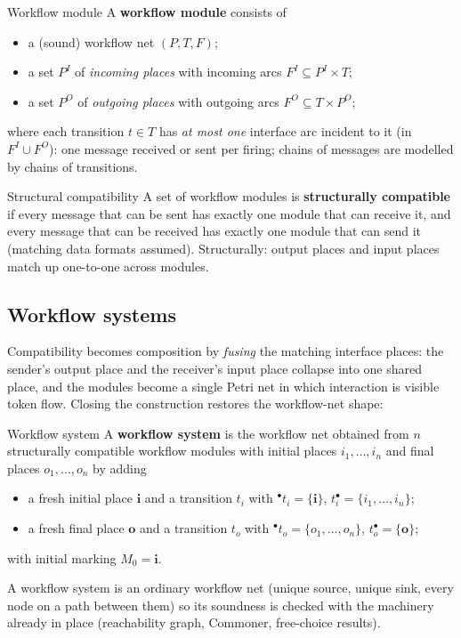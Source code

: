 \begin{definitionbox}{Workflow module}
A \textbf{workflow module} consists of
\begin{itemize}
  \item a (sound) workflow net $(P, T, F)$;
  \item a set $P^I$ of \emph{incoming places} with incoming arcs $F^I \subseteq P^I \times T$;
  \item a set $P^O$ of \emph{outgoing places} with outgoing arcs $F^O \subseteq T \times P^O$;
\end{itemize}
where each transition $t \in T$ has \emph{at most one} interface arc incident to it (in $F^I \cup F^O$): one message received or sent per firing; chains of messages are modelled by chains of transitions.
\end{definitionbox}
\begin{definitionbox}{Structural compatibility}
A set of workflow modules is \textbf{structurally compatible} if every message that can be sent has exactly one module that can receive it, and every message that can be received has exactly one module that can send it (matching data formats assumed). Structurally: output places and input places match up one-to-one across modules.
\end{definitionbox}

\subsection{Workflow systems}

Compatibility becomes composition by \emph{fusing} the matching interface places: the sender's output place and the receiver's input place collapse into one shared place, and the modules become a single Petri net in which interaction is visible token flow. Closing the construction restores the workflow-net shape:
\begin{definitionbox}{Workflow system}
A \textbf{workflow system} is the workflow net obtained from $n$ structurally compatible workflow modules with initial places $i_1, \dots, i_n$ and final places $o_1, \dots, o_n$ by adding
\begin{itemize}
  \item a fresh initial place $\mathbf{i}$ and a transition $t_i$ with $^{\bullet}t_i = \{\mathbf{i}\}$, $t_i^{\bullet} = \{i_1, \dots, i_n\}$;
  \item a fresh final place $\mathbf{o}$ and a transition $t_o$ with $^{\bullet}t_o = \{o_1, \dots, o_n\}$, $t_o^{\bullet} = \{\mathbf{o}\}$;
\end{itemize}
with initial marking $M_0 = \mathbf{i}$.
\end{definitionbox}
A workflow system is an ordinary workflow net (unique source, unique sink, every node on a path between them) so its soundness is checked with the machinery already in place (reachability graph, Commoner, free-choice results).

